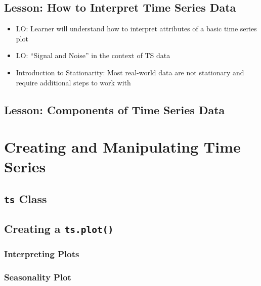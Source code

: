 \documentclass[
]{book}
\providecommand{\tightlist}{%
  \setlength{\itemsep}{0pt}\setlength{\parskip}{0pt}}
\begin{document}
\hypertarget{lesson-how-to-interpret-time-series-data}{%
\section{Lesson: How to Interpret Time Series Data}\label{lesson-how-to-interpret-time-series-data}}

\begin{itemize}
\tightlist
\item
  LO: Learner will understand how to interpret attributes of a basic time series plot
\item
  LO: ``Signal and Noise'' in the context of TS data
\item
  Introduction to Stationarity: Most real-world data are not stationary and require additional steps to work with
\end{itemize}

\hypertarget{lesson-components-of-time-series-data}{%
\section{Lesson: Components of Time Series Data}\label{lesson-components-of-time-series-data}}

\hypertarget{creating-and-manipulating-time-series}{%
\chapter{Creating and Manipulating Time Series}\label{creating-and-manipulating-time-series}}

\hypertarget{ts-class}{%
\section{\texorpdfstring{\texttt{ts} Class}{ts Class}}\label{ts-class}}

\hypertarget{creating-a-ts.plot}{%
\section{\texorpdfstring{Creating a \texttt{ts.plot()}}{Creating a ts.plot()}}\label{creating-a-ts.plot}}

\hypertarget{interpreting-plots}{%
\subsection{Interpreting Plots}\label{interpreting-plots}}

\hypertarget{seasonality-plot}{%
\subsection{Seasonality Plot}\label{seasonality-plot}}
\end{document}
